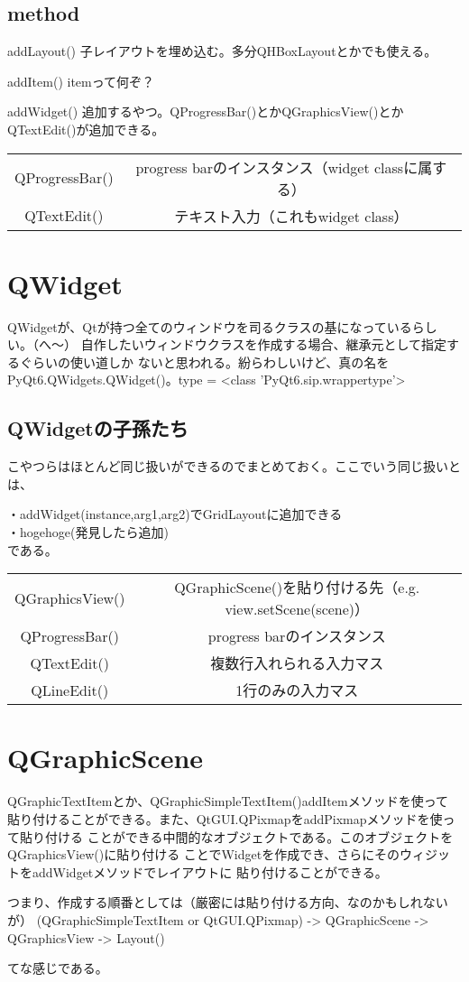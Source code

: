 \documentclass{ltjarticle}
\begin{document}
\subsection{method}
addLayout()
子レイアウトを埋め込む。多分QHBoxLayoutとかでも使える。\par
addItem()
itemって何ぞ？\par
addWidget()
追加するやつ。QProgressBar()とかQGraphicsView()とかQTextEdit()が追加できる。
\begin{longtable}{c||c}
  QProgressBar() & progress barのインスタンス（widget classに属する）\\
  QTextEdit() & テキスト入力（これもwidget class）
\end{longtable}


\section{QWidget}
QWidgetが、Qtが持つ全てのウィンドウを司るクラスの基になっているらしい。（へ～）
自作したいウィンドウクラスを作成する場合、継承元として指定するぐらいの使い道しか
ないと思われる。紛らわしいけど、真の名をPyQt6.QWidgets.QWidget()。type = <class 'PyQt6.sip.wrappertype'>
\subsection{QWidgetの子孫たち}
こやつらはほとんど同じ扱いができるのでまとめておく。ここでいう同じ扱いとは、\par
・addWidget(instance,arg1,arg2)でGridLayoutに追加できる\\
・hogehoge(発見したら追加)\\
である。
\begin{longtable}{c||c}
  QGraphicsView() & QGraphicScene()を貼り付ける先（e.g. view.setScene(scene)）\\
  QProgressBar() & progress barのインスタンス\\
  QTextEdit() & 複数行入れられる入力マス\\
  QLineEdit() & 1行のみの入力マス
\end{longtable}


\section{QGraphicScene}
QGraphicTextItemとか、QGraphicSimpleTextItem()addItemメソッドを使って
貼り付けることができる。また、QtGUI.QPixmapをaddPixmapメソッドを使って貼り付ける
ことができる中間的なオブジェクトである。このオブジェクトをQGraphicsView()に貼り付ける
ことでWidgetを作成でき、さらにそのウィジットをaddWidgetメソッドでレイアウトに
貼り付けることができる。\par
つまり、作成する順番としては（厳密には貼り付ける方向、なのかもしれないが）
(QGraphicSimpleTextItem or QtGUI.QPixmap) -> QGraphicScene
-> QGraphicsView -> Layout() \par
てな感じである。

\end{document}
